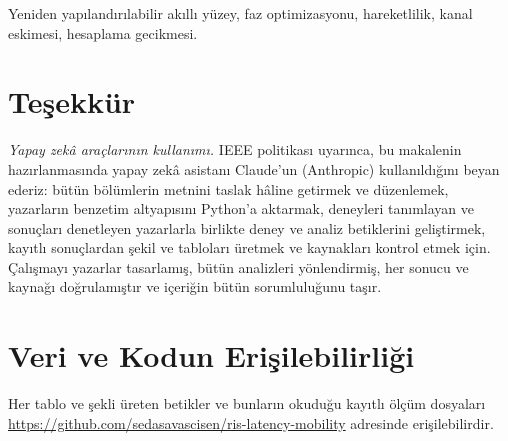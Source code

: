 \documentclass[journal]{IEEEtran}
\begin{document}
\begin{IEEEkeywords}
Yeniden yapılandırılabilir akıllı yüzey, faz optimizasyonu, hareketlilik, kanal eskimesi, hesaplama gecikmesi.
\end{IEEEkeywords}









\section*{Teşekkür}
\emph{Yapay zekâ araçlarının kullanımı.} IEEE politikası uyarınca, bu makalenin hazırlanmasında yapay zekâ asistanı Claude'un (Anthropic) kullanıldığını beyan ederiz: bütün bölümlerin metnini taslak hâline getirmek ve düzenlemek, yazarların benzetim altyapısını Python'a aktarmak, deneyleri tanımlayan ve sonuçları denetleyen yazarlarla birlikte deney ve analiz betiklerini geliştirmek, kayıtlı sonuçlardan şekil ve tabloları üretmek ve kaynakları kontrol etmek için. Çalışmayı yazarlar tasarlamış, bütün analizleri yönlendirmiş, her sonucu ve kaynağı doğrulamıştır ve içeriğin bütün sorumluluğunu taşır.

\section*{Veri ve Kodun Erişilebilirliği}
Her tablo ve şekli üreten betikler ve bunların okuduğu kayıtlı ölçüm dosyaları \url{https://github.com/sedasavascisen/ris-latency-mobility} adresinde erişilebilirdir.



\end{document}
